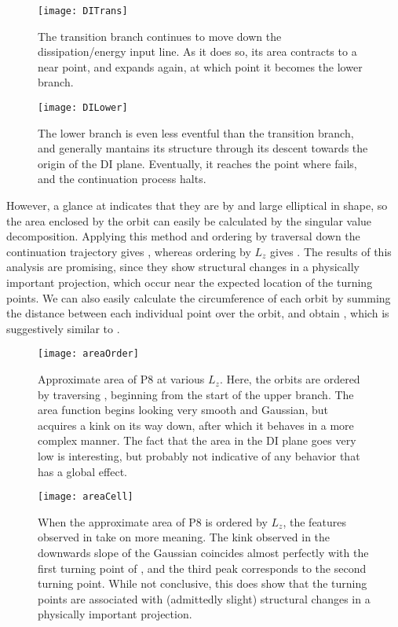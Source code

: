 \begin{figure}[h]
\texttt{[image: DITrans]}
\caption{The transition branch continues to move down the dissipation/energy input line. As it does so, its area contracts to a near point, and expands again, at which point it becomes the lower branch. }\label{fig:DITrans}
\end{figure}

\begin{figure}[h]
\texttt{[image: DILower]}
\caption{The lower branch is even less eventful than the transition branch, and generally mantains its structure through its descent towards the origin of the DI plane. Eventually, it reaches the point where  fails, and the continuation process halts.}\label{fig:DILower}
\end{figure}

However, a glance at  indicates that they are by and large elliptical in shape, so the area enclosed by the orbit can easily be calculated by the singular value decomposition. Applying this method and ordering by traversal down the continuation trajectory gives , whereas ordering by $L_z$ gives . The results of this analysis are promising, since they show structural changes in a physically important projection, which occur near the expected location of the turning points. We can also easily calculate the circumference of each orbit by summing the distance between each individual point over the orbit, and obtain , which is suggestively similar to . \\

\begin{figure}[h!]
\texttt{[image: areaOrder]}
\caption{Approximate area of P8 at various $L_z$. Here, the orbits are ordered by traversing , beginning from the start of the upper branch. The area function begins looking very smooth and Gaussian, but acquires a kink on its way down, after which it behaves in a more complex manner. The fact that the area in the DI plane goes very low is interesting, but probably not indicative of any behavior that has a global effect.}\label{fig:areaOrder}
\end{figure}

\begin{figure}[h!]
\texttt{[image: areaCell]}
\caption{When the approximate area of P8 is ordered by $L_z$, the features observed in  take on more meaning. The kink observed in the downwards slope of the Gaussian coincides almost perfectly with the first turning point of , and the third peak corresponds to the second turning point. While not conclusive, this does show that the turning points are associated with (admittedly slight) structural changes in a physically important projection. }\label{fig:areaCell}
\end{figure}

